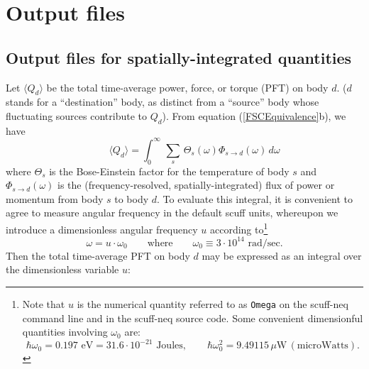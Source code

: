 \documentclass[letterpaper]{article}
\begin{document}
\newpage
\section{Output files}

\subsection{Output files for spatially-integrated quantities}

Let $\big\langle Q_d\big\rangle$ be the total time-average 
power, force, or torque (PFT) on body $d$. ($d$ stands for a 
``destination'' body, as distinct from a ``source'' body
whose fluctuating sources contribute to $Q_d$). From 
equation (\ref{FSCEquivalence}b), we have
\begin{equation}
 \qquad \big\langle Q_d\big\rangle
 = \int_0^\infty \, \sum_s \, \Theta_s(\omega) 
   \Phi_{s\to d}(\omega)\,d\omega
\end{equation}
where $\Theta_s$ is the Bose-Einstein factor for the temperature 
of body $s$ and $\Phi_{s \to d}(\omega)$ is the 
(frequency-resolved, spatially-integrated) flux of power or momentum
from body $s$ to body $d$.
To evaluate this integral, it is convenient to agree to measure angular
frequency in the default {\sc scuff} units, whereupon we 
introduce a dimensionless angular frequency $u$ according 
to\footnote{Note that $u$ is the numerical quantity referred to as 
\texttt{Omega} on the {\sc scuff-neq} command line and in the 
{\sc scuff-neq} source code. Some convenient
dimensionful quantities involving $\omega_0$ are:
$$
 \hbar\omega_0=0.197\text{ eV}=31.6\cdot10^{-21} \text{ Joules}, 
 \qquad 
 \hbar\omega_0^2=9.49115\,\mu\text{W} \, (\text{microWatts}).
$$}
$$ \omega=u\cdot \omega_0
   \qquad \text{where} \qquad
   \omega_0\equiv 3\cdot 10^{14}\text{ rad/sec}.
$$
Then the total time-average PFT on body $d$ may be
expressed as an integral over the dimensionless variable $u$:
\end{document}
